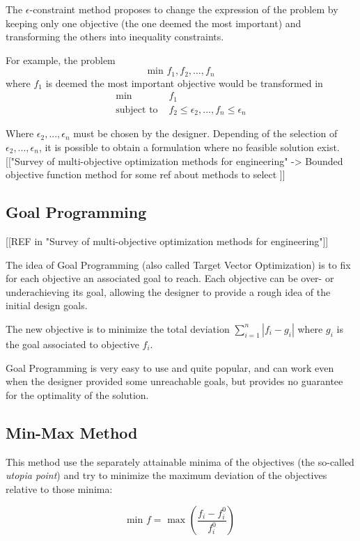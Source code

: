 The $\epsilon$-constraint method proposes to change the expression of the problem by keeping only one objective (the one deemed the most important) and transforming the others into inequality constraints.

For example, the problem \[\text{min } f_1, f_2, ...,f_n\] where $f_1$ is deemed the most important objective would be transformed in
\begin{align*}
\text{min } &f_1 \\
\text{subject to } &f_2 \leq \epsilon_2, ..., f_n \leq \epsilon_n
\end{align*}

Where $\epsilon_2, ..., \epsilon_n$ must be chosen by the designer.
Depending of the selection of $\epsilon_2, ..., \epsilon_n$, it is possible to obtain a formulation where no feasible solution exist.
[["Survey of multi-objective optimization methods for engineering" -> Bounded objective function method for some ref about methods to select \epsilon]]

\subsection{Goal Programming}

[[REF in "Survey of multi-objective optimization methods for engineering"]]

The idea of Goal Programming (also called Target Vector Optimization) is to fix for each objective an associated goal to reach. Each objective can be over- or underachieving its goal, allowing the designer to provide a rough idea of the initial design goals.

The new objective is to minimize the total deviation $\sum_{i=1}^n |f_i - g_i|$ where $g_i$ is the goal associated to objective $f_i$.

Goal Programming is very easy to use and quite popular, and can work even when the designer provided some unreachable goals, but provides no guarantee for the optimality of the solution.

\subsection{Min-Max Method}

This method use the separately attainable minima of the objectives (the so-called \emph{utopia point}) and try to minimize the maximum deviation of the objectives relative to those minima:

\[ \text{min } f = \text{ max } \left( \frac{f_i - f_i^0}{f_i^0} \right) \]

